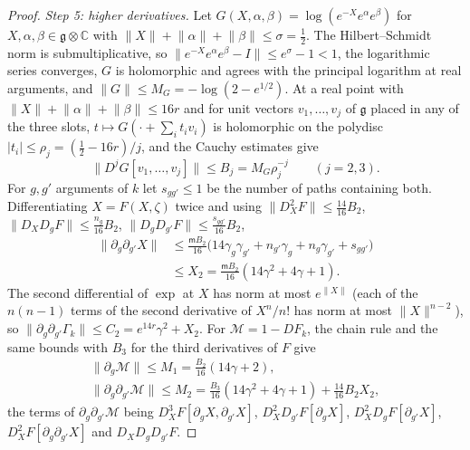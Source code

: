 \documentclass[11pt]{amsart}
\theoremstyle{definition}
\theoremstyle{remark}
\numberwithin{equation}{section}
\newcommand{\C}{\mathbb{C}}
\newcommand{\g}{\mathfrak{g}}
\begin{document}
\begin{proof}
\emph{Step 5: higher derivatives.} Let $G(X,\alpha,\beta)=
\log(e^{-X}e^\alpha e^\beta)$ for $X,\alpha,\beta\in\g\otimes\C$ with
$\lVert X\rVert+\lVert\alpha\rVert+\lVert\beta\rVert\le\sigma=\frac12$.
The Hilbert--Schmidt norm is submultiplicative, so
$\lVert e^{-X}e^\alpha e^\beta-I\rVert\le e^\sigma-1<1$, the logarithmic
series converges, $G$ is holomorphic and agrees with the principal
logarithm at real arguments, and $\lVert G\rVert\le M_G=-\log(2-e^{1/2})$.
At a real point with $\lVert X\rVert+\lVert\alpha\rVert+\lVert\beta
\rVert\le16r$ and for unit vectors $v_1,\dots,v_j$ of $\g$ placed in any
of the three slots, $t\mapsto G(\cdot+\sum_it_iv_i)$ is holomorphic on the
polydisc $\lvert t_i\rvert\le\rho_j=(\frac12-16r)/j$, and the Cauchy
estimates give
\[
\lVert D^jG[v_1,\dots,v_j]\rVert\le B_j=M_G\rho_j^{-j}\qquad(j=2,3).
\]
For $g,g'$ arguments of $k$ let $s_{gg'}\le1$ be the number of paths
containing both. Differentiating $X=F(X,\zeta)$ twice and using
$\lVert D_X^2F\rVert\le\frac{14}{16}B_2$,
$\lVert D_XD_gF\rVert\le\frac{n_g}{16}B_2$,
$\lVert D_gD_{g'}F\rVert\le\frac{s_{gg'}}{16}B_2$,
\begin{align*}
\lVert\partial_g\partial_{g'}X\rVert&\le\frac{\mathsf mB_2}{16}
\bigl(14\gamma_g\gamma_{g'}+n_{g'}\gamma_g+n_g\gamma_{g'}+s_{gg'}\bigr)\\
&\le X_2=\frac{\mathsf mB_2}{16}(14\gamma^2+4\gamma+1).
\end{align*}
The second differential of $\exp$ at $X$ has norm at most
$e^{\lVert X\rVert}$ (each of the $n(n-1)$ terms of the second
derivative of $X^n/n!$ has norm at most $\lVert X\rVert^{n-2}$), so
$\lVert\partial_g\partial_{g'}\Gamma_k\rVert\le C_2=e^{14r}\gamma^2+X_2$.
For $\mathcal M=1-DF_k$, the chain rule and the same bounds with $B_3$
for the third derivatives of $F$ give
\begin{gather*}
\lVert\partial_g\mathcal M\rVert\le M_1=\frac{B_2}{16}(14\gamma+2),\\
\lVert\partial_g\partial_{g'}\mathcal M\rVert\le M_2=\frac{B_3}{16}
(14\gamma^2+4\gamma+1)+\frac{14}{16}B_2X_2 ,
\end{gather*}
the terms of $\partial_g\partial_{g'}\mathcal M$ being
$D_X^3F[\partial_gX,\partial_{g'}X]$, $D_X^2D_{g'}F[\partial_gX]$,
$D_X^2D_gF[\partial_{g'}X]$, $D_X^2F[\partial_g\partial_{g'}X]$ and
$D_XD_gD_{g'}F$.


\end{proof}
\end{document}
